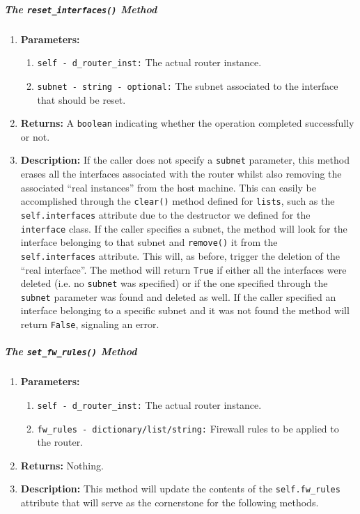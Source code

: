         \subparagraph{The \texttt{reset\_interfaces()} Method}
            \begin{enumerate}
                \item \textbf{Parameters:}
                \begin{enumerate}
                    \item \texttt{self - d\_router\_inst:} The actual router instance.
                    \item \texttt{subnet - string - optional:} The subnet associated to the interface that should be reset.
                \end{enumerate}
                \item \textbf{Returns:} A \texttt{boolean} indicating whether the operation completed successfully or not.
                \item \textbf{Description:} If the caller does not specify a \texttt{subnet} parameter, this method erases all the interfaces associated with the router whilst also removing the associated ``real instances'' from the host machine. This can easily be accomplished through the \texttt{clear()} \cite{bib:python-datastructures} method defined for \texttt{lists}, such as the \texttt{self.interfaces} attribute due to the destructor we defined for the \texttt{interface} class. If the caller specifies a subnet, the method will look for the interface belonging to that subnet and \texttt{remove()} it from the \texttt{self.interfaces} attribute. This will, as before, trigger the deletion of the ``real interface''. The method will return \texttt{True} if either all the interfaces were deleted (i.e. no \texttt{subnet} was specified) or if the one specified through the \texttt{subnet} parameter was found and deleted as well. If the caller specified an interface belonging to a specific subnet and it was not found the method will return \texttt{False}, signaling an error.
            \end{enumerate}

        \subparagraph{The \texttt{set\_fw\_rules()} Method}
            \begin{enumerate}
                \item \textbf{Parameters:}
                \begin{enumerate}
                    \item \texttt{self - d\_router\_inst:} The actual router instance.
                    \item \texttt{fw\_rules - dictionary/list/string:} Firewall rules to be applied to the router.
                \end{enumerate}
                \item \textbf{Returns:} Nothing.
                \item \textbf{Description:} This method will update the contents of the \texttt{self.fw\_rules} attribute that will serve as the cornerstone for the following methods.
            \end{enumerate}

